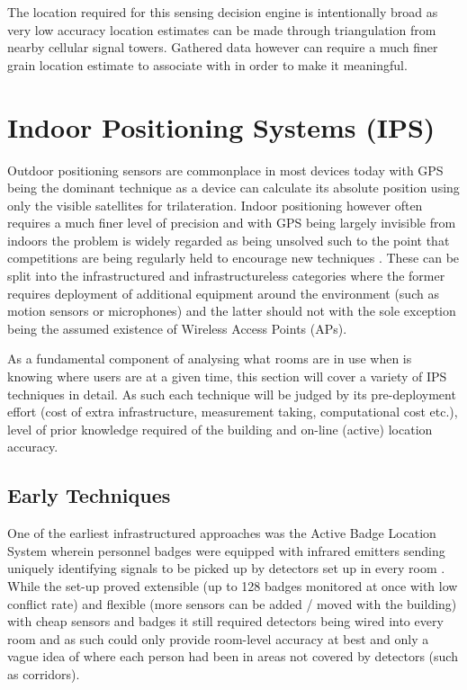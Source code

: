 \documentclass{UoYCSproject}
\begin{document}
            The location required for this sensing decision engine is intentionally broad as very low accuracy location estimates can be made through triangulation from nearby cellular signal towers. Gathered data however can require a much finer grain location estimate to associate with in order to make it meaningful.
                
        \section{Indoor Positioning Systems (IPS)}
        \label{sec:ips}
        
            Outdoor positioning sensors are commonplace in most devices today with GPS being the dominant technique as a device can calculate its absolute position using only the visible satellites for trilateration. Indoor positioning however often requires a much finer level of precision and with GPS being largely invisible from indoors the problem is widely regarded as being unsolved such to the point that competitions are being regularly held to encourage new techniques \citep{MSLOCComp}. These can be split into  the infrastructured and infrastructureless categories where the former requires deployment of additional equipment around the environment (such as motion sensors or microphones) and the latter should not with the sole exception being the assumed existence of Wireless Access Points (APs).
            
            As a fundamental component of analysing what rooms are in use when is knowing where users are at a given time, this section will cover a variety of IPS techniques in detail. As such each technique will be judged by its pre-deployment effort (cost of extra infrastructure, measurement taking, computational cost etc.), level of prior knowledge required of the building and on-line (active) location accuracy.
            
            \subsection{Early Techniques}
            \label{sec:early}
            
                One of the earliest infrastructured approaches was the Active Badge Location System wherein personnel badges were equipped with infrared emitters sending uniquely identifying signals to be picked up by detectors set up in every room \citep{want1992active}. While the set-up proved extensible (up to 128 badges monitored at once with low conflict rate) and flexible (more sensors can be added / moved with the building) with cheap sensors and badges it still required detectors being wired into every room and as such could only provide room-level accuracy at best and only a vague idea of where each person had been in areas not covered by detectors (such as corridors). 
            
\end{document}
